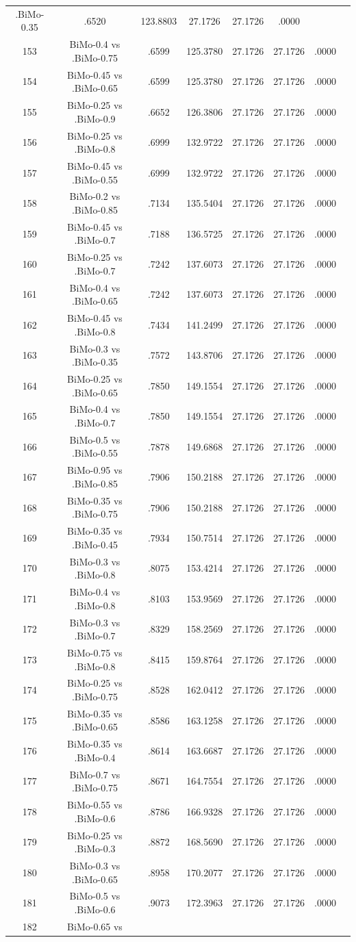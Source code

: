 \documentclass[a4paper,10pt]{article}
\begin{document}
\begin{landscape}
\begin{table}[!htp]
\begin{tabular}{cccccccc}
.BiMo-0.35&.6520&123.8803&27.1726&27.1726&.0000\\153&BiMo-0.4 vs .BiMo-0.75&.6599&125.3780&27.1726&27.1726&.0000\\154&BiMo-0.45 vs .BiMo-0.65&.6599&125.3780&27.1726&27.1726&.0000\\155&BiMo-0.25 vs .BiMo-0.9&.6652&126.3806&27.1726&27.1726&.0000\\156&BiMo-0.25 vs .BiMo-0.8&.6999&132.9722&27.1726&27.1726&.0000\\157&BiMo-0.45 vs .BiMo-0.55&.6999&132.9722&27.1726&27.1726&.0000\\158&BiMo-0.2 vs .BiMo-0.85&.7134&135.5404&27.1726&27.1726&.0000\\159&BiMo-0.45 vs .BiMo-0.7&.7188&136.5725&27.1726&27.1726&.0000\\160&BiMo-0.25 vs .BiMo-0.7&.7242&137.6073&27.1726&27.1726&.0000\\161&BiMo-0.4 vs .BiMo-0.65&.7242&137.6073&27.1726&27.1726&.0000\\162&BiMo-0.45 vs .BiMo-0.8&.7434&141.2499&27.1726&27.1726&.0000\\163&BiMo-0.3 vs .BiMo-0.35&.7572&143.8706&27.1726&27.1726&.0000\\164&BiMo-0.25 vs .BiMo-0.65&.7850&149.1554&27.1726&27.1726&.0000\\165&BiMo-0.4 vs .BiMo-0.7&.7850&149.1554&27.1726&27.1726&.0000\\166&BiMo-0.5 vs .BiMo-0.55&.7878&149.6868&27.1726&27.1726&.0000\\167&BiMo-0.95 vs .BiMo-0.85&.7906&150.2188&27.1726&27.1726&.0000\\168&BiMo-0.35 vs .BiMo-0.75&.7906&150.2188&27.1726&27.1726&.0000\\169&BiMo-0.35 vs .BiMo-0.45&.7934&150.7514&27.1726&27.1726&.0000\\170&BiMo-0.3 vs .BiMo-0.8&.8075&153.4214&27.1726&27.1726&.0000\\171&BiMo-0.4 vs .BiMo-0.8&.8103&153.9569&27.1726&27.1726&.0000\\172&BiMo-0.3 vs .BiMo-0.7&.8329&158.2569&27.1726&27.1726&.0000\\173&BiMo-0.75 vs .BiMo-0.8&.8415&159.8764&27.1726&27.1726&.0000\\174&BiMo-0.25 vs .BiMo-0.75&.8528&162.0412&27.1726&27.1726&.0000\\175&BiMo-0.35 vs .BiMo-0.65&.8586&163.1258&27.1726&27.1726&.0000\\176&BiMo-0.35 vs .BiMo-0.4&.8614&163.6687&27.1726&27.1726&.0000\\177&BiMo-0.7 vs .BiMo-0.75&.8671&164.7554&27.1726&27.1726&.0000\\178&BiMo-0.55 vs .BiMo-0.6&.8786&166.9328&27.1726&27.1726&.0000\\179&BiMo-0.25 vs .BiMo-0.3&.8872&168.5690&27.1726&27.1726&.0000\\180&BiMo-0.3 vs .BiMo-0.65&.8958&170.2077&27.1726&27.1726&.0000\\181&BiMo-0.5 vs .BiMo-0.6&.9073&172.3963&27.1726&27.1726&.0000\\182&BiMo-0.65 vs 
\end{tabular}
\end{table}
\end{landscape}
\end{document}
